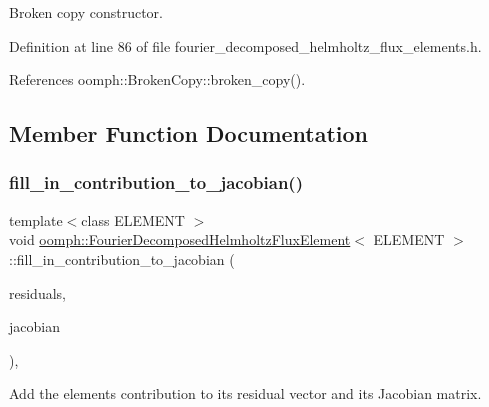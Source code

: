 Broken copy constructor. 



Definition at line 86 of file fourier\+\_\+decomposed\+\_\+helmholtz\+\_\+flux\+\_\+elements.\+h.



References oomph\+::\+Broken\+Copy\+::broken\+\_\+copy().



\subsection{Member Function Documentation}
\mbox{\label{classoomph_1_1FourierDecomposedHelmholtzFluxElement_afca29e11428579eb58e4bca7f97b0151}} 
\subsubsection{\texorpdfstring{fill\+\_\+in\+\_\+contribution\+\_\+to\+\_\+jacobian()}{fill\_in\_contribution\_to\_jacobian()}}
{\footnotesize\ttfamily template$<$class E\+L\+E\+M\+E\+NT $>$ \\
void \hyperlink{classoomph_1_1FourierDecomposedHelmholtzFluxElement}{oomph\+::\+Fourier\+Decomposed\+Helmholtz\+Flux\+Element}$<$ E\+L\+E\+M\+E\+NT $>$\+::fill\+\_\+in\+\_\+contribution\+\_\+to\+\_\+jacobian (\begin{DoxyParamCaption}\item[{\hyperlink{classoomph_1_1Vector}{Vector}$<$ double $>$ \&}]{residuals,  }\item[{\hyperlink{classoomph_1_1DenseMatrix}{Dense\+Matrix}$<$ double $>$ \&}]{jacobian }\end{DoxyParamCaption})\hspace{0.3cm}{\ttfamily [inline]}, {\ttfamily [virtual]}}



Add the element\textquotesingle{}s contribution to its residual vector and its Jacobian matrix. 



